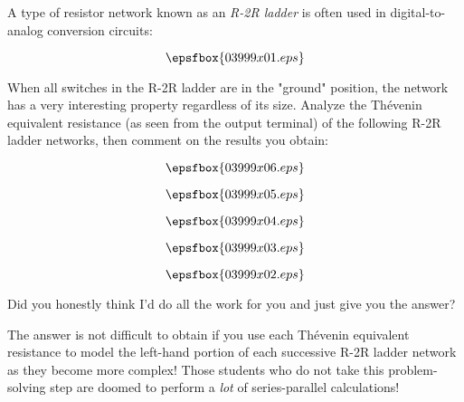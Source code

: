 

A type of resistor network known as an {\it R-2R ladder} is often used in digital-to-analog conversion circuits:

$$\epsfbox{03999x01.eps}$$

When all switches in the R-2R ladder are in the "ground" position, the network has a very interesting property regardless of its size.  Analyze the Th\'evenin equivalent resistance (as seen from the output terminal) of the following R-2R ladder networks, then comment on the results you obtain:

$$\epsfbox{03999x06.eps}$$

$$\epsfbox{03999x05.eps}$$

$$\epsfbox{03999x04.eps}$$

$$\epsfbox{03999x03.eps}$$

$$\epsfbox{03999x02.eps}$$







Did you honestly think I'd do all the work for you and just give you the answer?







The answer is not difficult to obtain if you use each Th\'evenin equivalent resistance to model the left-hand portion of each successive R-2R ladder network as they become more complex!  Those students who do not take this problem-solving step are doomed to perform a {\it lot} of series-parallel calculations!




